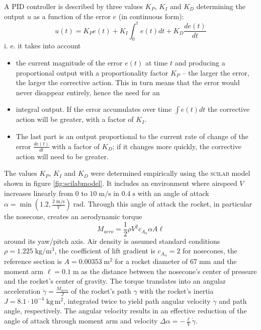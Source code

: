\documentclass[a4paper]{article}
\renewcommand{\u}[1]{\;\mathrm{#1}}
\begin{document}
A PID controller is described by three values $K_P$, $K_I$ and $K_D$ determining the output $u$ as a function of the error $e$ (in continuous form): \begin{equation}u(t) = K_P e(t) + K_I \int^t_0 e(t) dt + K_D \frac{de(t)}{dt}\end{equation}i. e. it takes into account
\begin{itemize}
\item the current magnitude of the error $e(t)$ at time $t$ and producing a proportional output with a proportionality factor $K_P$ -- the larger the error, the larger the corrective action. This in turn means that the error would never disappear entirely, hence the need for an
\item integral output. If the error accumulates over time $\int e(t) dt$ the corrective action will be greater, with a factor of $K_I$.
\item The last part is an output proportional to the current rate of change of the error $\frac{de(t)}{dt}$ with a factor of $K_D$; if it changes more quickly, the corrective action will need to be greater.
\end{itemize}
The values $K_P$, $K_I$ and $K_D$ were determined empirically using the \textsc{scilab} model shown in figure \ref{fig:scilabmodel}. It includes an environment where airspeed $V$ increases linearly from $0$ to $10\u{m/s}$ in $0.4\u{s}$ with an angle of attack $\alpha = \min \left(1.2, \frac{2\u{m/s}}{V} \right)\u{rad}$. Through this angle of attack the rocket, in particular the nosecone, creates an aerodynamic torque \begin{equation}M_{aero} = \frac{1}{2} \rho V^2 c_{A_{\alpha}} \alpha A \ell \end{equation} around its yaw/pitch axis. Air density is assumed standard conditions $\rho = 1.225 \u{kg/m^3}$, the coefficient of lift gradient is $c_{A_{\alpha}} = 2$ for nosecones, the reference section is $A = 0.00353\u{m^2}$ for a rocket diameter of $67\u{mm}$ and the moment arm $\ell = 0.1\u{m}$ as the distance between the nosecone's center of pressure and the rocket's center of gravity. The torque translates into an angular acceleration $\ddot{\gamma} = \frac{M_{aero}}{J}$ of the rocket's path $\gamma$ with the rocket's inertia $J=8.1 \cdot 10^{-4}\u{kg\,m^2}$, integrated twice to yield path angular velocity $\dot{\gamma}$ and path angle, respectively. The angular velocity results in an effective reduction of the angle of attack through moment arm and velocity $\Delta \alpha = - \frac{\ell}{V} \dot{\gamma}$.
\end{document}
